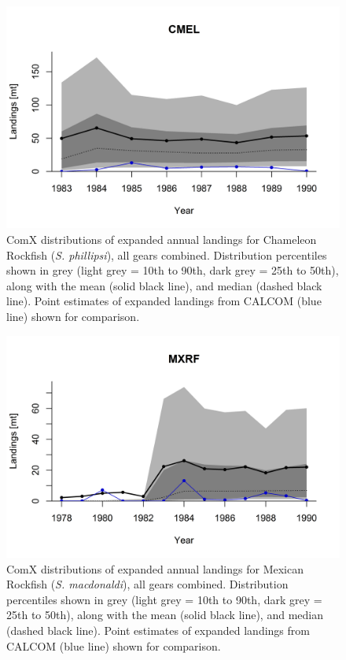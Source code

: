 \documentclass[12pt]{article}
\begin{document}
%
\clearpage
%

\begin{landscape}
\begin{figure}
\centering
\vspace{-2cm}
\includegraphics[width=1.3\textwidth]{./pictures/sp-yr/CMEL.png}
\caption{ComX distributions of expanded annual landings for Chameleon Rockfish 
(\textit{S. phillipsi}), all gears combined. Distribution percentiles shown in grey 
(light grey = 10th to 90th, dark grey = 25th to 50th), along with the mean 
(solid black line), and median (dashed black line). Point estimates of 
expanded landings from CALCOM (blue line) shown for comparison.}
\label{Y13}
\end{figure}
\end{landscape}

%
\clearpage
%

\begin{landscape}
\begin{figure}
\centering
\vspace{-2cm}
\includegraphics[width=1.3\textwidth]{./pictures/sp-yr/MXRF.png}
\caption{ComX distributions of expanded annual landings for Mexican Rockfish 
(\textit{S. macdonaldi}), all gears combined. Distribution percentiles shown in grey 
(light grey = 10th to 90th, dark grey = 25th to 50th), along with the mean 
(solid black line), and median (dashed black line). Point estimates of 
expanded landings from CALCOM (blue line) shown for comparison.}
\label{Y14}
\end{figure}
\end{landscape}
\end{document}
